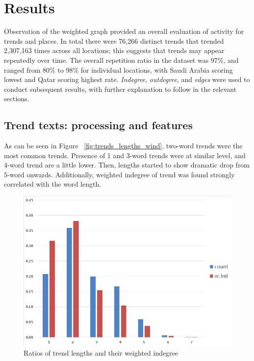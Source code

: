\documentclass[conference]{IEEEtran}
\begin{document}
\section{Results}\label{results}

Observation of the weighted graph provided an overall evaluation of
activity for trends and places. In total there were 76,266 distinct
trends that trended 2,307,163 times across all locations; this
suggests that trends may appear repeatedly over time. The overall
repetition ratio in the dataset was 97\%, and ranged from 80\% to 98\%
for individual locations, with Saudi Arabia scoring lowest and Qatar
scoring highest rate. {\emph{Indegree}}, {\emph{outdegree}}, and
{\emph{edges}} were used to conduct subsequent results, with further
explanation to follow in the relevant sections.

\subsection{Trend texts: processing and features}
As can be seen in  Figure ~\ref{fig:trends_lengths_wind}, two-word trends 
were the most common trends. Presence of 1 and 3-word trends were at 
similar level, and 4-word trend are a little lower. Then, lengths started to 
show dramatic drop from 5-word onwards. Additionally, weighted indegree 
of trend was found strongly correlated with the word length.

\begin{figure}[htb] \centering
\includegraphics[width=\columnwidth]{images/trends_lengths_wind.png}
\caption{Ratios of trend lengths and their weighted indegree}
\label{fig:tngraph}
\end{figure}
\end{document}
